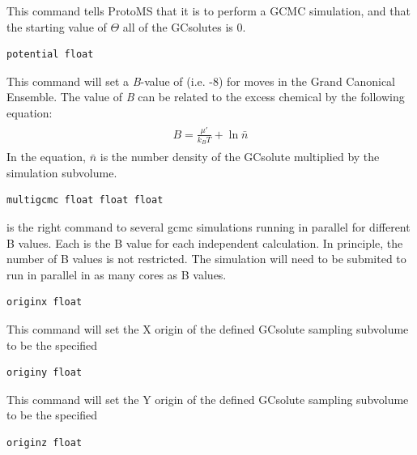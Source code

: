 \documentclass[letterpaper,10pt,english]{sphinxmanual}
\begin{document}
This command tells ProtoMS that it is to perform a GCMC simulation, and that the starting value of \(\Theta\) all of the GCsolutes is 0.

\begin{Verbatim}[commandchars=\\\{\}]
potential float
\end{Verbatim}

This command will set a \emph{B}-value of  (i.e. -8) for moves in the Grand Canonical Ensemble. The value of \emph{B} can be related to the excess chemical by the following equation:
\label{protoms:equation-bval}\begin{gather}
\begin{split}B = \frac{\mu'}{k_{B}T}+\ln \bar{n}\end{split}\label{protoms-bval}
\end{gather}
In the equation, \(\bar{n}\) is the number density of the GCsolute multiplied by the simulation subvolume.

\begin{Verbatim}[commandchars=\\\{\}]
multigcmc float float float
\end{Verbatim}

is the right command to several gcmc simulations running in parallel for different B values. Each  is the B value for each independent calculation. In principle, the number of B values is not restricted. The simulation will need to be submited to run in parallel in as many cores as B values.

\begin{Verbatim}[commandchars=\\\{\}]
originx float
\end{Verbatim}

This command will set the X origin of the defined GCsolute sampling subvolume to be the specified 

\begin{Verbatim}[commandchars=\\\{\}]
originy float
\end{Verbatim}

This command will set the Y origin of the defined GCsolute sampling subvolume to be the specified 

\begin{Verbatim}[commandchars=\\\{\}]
originz float
\end{Verbatim}
\end{document}
